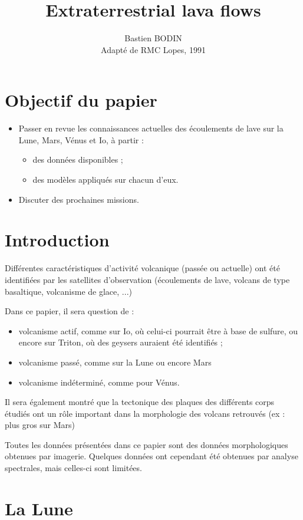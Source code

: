 \documentclass[10pt,a4paper, twocolumns]{article}
\author{Bastien BODIN\\ Adapté de RMC Lopes, 1991}
\title{Extraterrestrial lava flows}
\begin{document}
\twocolumn

\maketitle
\section{Objectif du papier}
\begin{itemize}
	\item Passer en revue les connaissances actuelles des écoulements de lave sur la Lune, Mars, Vénus et Io, à partir :
	\begin{itemize}
		\item des données disponibles ;
		\item des modèles appliqués sur chacun d'eux.
	\end{itemize}
	\item Discuter des prochaines missions.
\end{itemize}

\section{Introduction}

Différentes caractéristiques d'activité volcanique (passée ou actuelle) ont été identifiées par les satellites d'observation (écoulements de lave, volcans de type basaltique, volcanisme de glace, ...)

Dans ce papier, il sera question de :
\begin{itemize}
	\item volcanisme actif, comme sur Io, où celui-ci pourrait être à base de sulfure, ou encore sur Triton, où des geysers auraient été identifiés ;
	\item volcanisme passé, comme sur la Lune ou encore Mars
	\item volcanisme indéterminé, comme pour Vénus.
\end{itemize}

Il sera également montré que la tectonique des plaques des différents corps étudiés ont un rôle important  dans la morphologie des volcans retrouvés (ex : plus gros sur Mars)

Toutes les données présentées dans ce papier sont des données morphologiques obtenues par imagerie. Quelques données ont cependant été obtenues par analyse spectrales, mais celles-ci sont limitées.

\section{La Lune}
\end{document}
